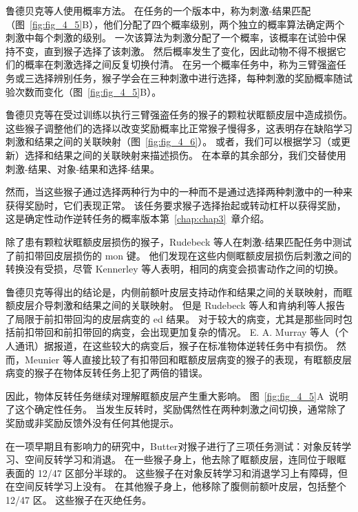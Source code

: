 鲁德贝克等人\cite{rudebeck2008frontal}使用概率方法。
在任务的一个版本中，称为刺激-结果匹配（图~\ref{fig:fig_4_5}B），他们分配了四个概率级别，两个独立的概率算法确定两个刺激中每个刺激的级别。
一次该算法为刺激分配了一个概率，该概率在试验中保持不变，直到猴子选择了该刺激。
然后概率发生了变化，因此动物不得不根据它们的概率在刺激选择之间反复切换付清。
在另一个概率任务中，称为三臂强盗任务或三选择辨别任务，猴子学会在三种刺激中进行选择，每种刺激的奖励概率随试验次数而变化（图~\ref{fig:fig_4_5}B）。\par


鲁德贝克等在受过训练以执行三臂强盗任务的猴子的颗粒状眶额皮层中造成损伤。
这些猴子调整他们的选择以改变奖励概率比正常猴子慢得多，这表明存在缺陷学习刺激和结果之间的关联映射（图~\ref{fig:fig_4_6}）。
或者，我们可以根据学习（或更新）选择和结果之间的关联映射来描述损伤。
在本章的其余部分，我们交替使用刺激-结果、对象-结果和选择-结果。\par


然而，当这些猴子通过选择两种行为中的一种而不是通过选择两种刺激中的一种来获得奖励时，它们表现正常。
该任务要求猴子选择抬起或转动杠杆以获得奖励，这是确定性动作逆转任务的概率版本第~\ref{chap:chap3}~章介绍。\par


除了患有颗粒状眶额皮层损伤的猴子，Rudebeck 等人在刺激-结果匹配任务中测试了前扣带回皮层损伤的 mon 键。
他们发现在这些内侧眶额皮层损伤后刺激之间的转换没有受损，尽管 Kennerley 等人\cite{kennerley2006optimal}表明，相同的病变会损害动作之间的切换。\par



鲁德贝克等得出的结论是，内侧前额叶皮层支持动作和结果之间的关联映射，而眶额皮层介导刺激和结果之间的关联映射。
但是 Rudebeck 等人和肯纳利等人报告了局限于前扣带回沟的皮层病变的 ed 结果。
对于较大的病变，尤其是那些同时包括前扣带回和前扣带回的病变，会出现更加复杂的情况。
E. A. Murray 等人（个人通讯）据报道，在这些较大的病变后，猴子在标准物体逆转任务中有损伤。
然而，Meunier 等人\cite{meunier1997effects}直接比较了有扣带回和眶额皮层病变的猴子的表现，有眶额皮层病变的猴子在物体反转任务上犯了两倍的错误。  \par


因此，物体反转任务继续对理解眶额皮层产生重大影响。
图~\ref{fig:fig_4_5}A~说明了这个确定性任务。
当发生反转时，奖励偶然性在两种刺激之间切换，通常除了奖励或非奖励反馈外没有任何其他提示。\par


在一项早期且有影响力的研究中，Butter\cite{butters1969retention}对猴子进行了三项任务测试：对象反转学习、空间反转学习和消退。
在一些猴子身上，他去除了眶额皮层，连同位于眼眶表面的 12/47 区部分半球的。
这些猴子在对象反转学习和消退学习上有障碍，但在空间反转学习上没有。
在其他猴子身上，他移除了腹侧前额叶皮层，包括整个 12/47 区。
这些猴子在灭绝任务。\par


